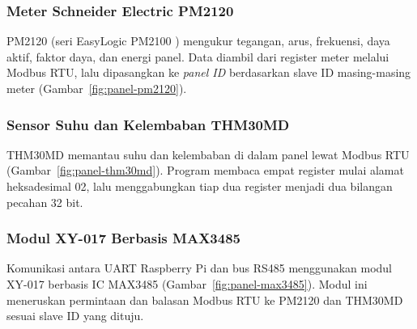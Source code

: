 \begingroup
\setlength{\BatasTinggiGambar}{4.3cm}
\endgroup

\Needspace{3cm}
\subsubsection{Meter Schneider Electric PM2120}

PM2120 (seri EasyLogic PM2100 \citep{schneiderpm2100}) mengukur tegangan, arus, frekuensi, daya aktif, faktor daya, dan energi panel. Data diambil dari register meter melalui Modbus RTU, lalu dipasangkan ke \textit{panel ID} berdasarkan slave ID masing-masing meter (Gambar~\ref{fig:panel-pm2120}).

\begingroup
\setlength{\BatasTinggiGambar}{4.5cm}
\endgroup

\Needspace{3cm}
\subsubsection{Sensor Suhu dan Kelembaban THM30MD}

THM30MD memantau suhu dan kelembaban di dalam panel lewat Modbus RTU (Gambar~\ref{fig:panel-thm30md}). Program membaca empat register mulai alamat heksadesimal 02, lalu menggabungkan tiap dua register menjadi dua bilangan pecahan 32 bit.

\begingroup
\setlength{\BatasTinggiGambar}{3.6cm}
\endgroup

\Needspace{3cm}
\subsubsection{Modul XY-017 Berbasis MAX3485}

Komunikasi antara UART Raspberry Pi dan bus RS485 menggunakan modul XY-017 berbasis IC MAX3485 \citep{max3485} (Gambar~\ref{fig:panel-max3485}). Modul ini meneruskan permintaan dan balasan Modbus RTU ke PM2120 dan THM30MD sesuai slave ID yang dituju.

